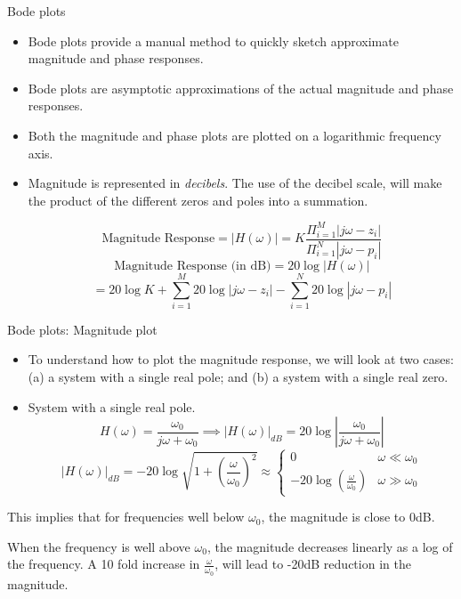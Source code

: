 \documentclass{beamer}
\begin{document}
\begin{frame}{Bode plots}

\begin{itemize}
\item Bode plots provide a manual method to quickly sketch approximate magnitude and phase responses.
\item Bode plots are asymptotic approximations of the actual magnitude and phase responses.
\item Both the magnitude and phase plots are plotted on a logarithmic frequency axis.
\item Magnitude is represented in \textit{decibels}. The use of the decibel scale, will make the product of the different zeros and poles into a summation.
\begin{small}
\[ \text{Magnitude Response} =\left|H(\omega)\right| = K \frac{\Pi_{i=1}^{M}\left|j\omega - z_i\right|}{\Pi_{i=1}^{N}\left|j\omega - p_i\right|} \]
\[ \text{Magnitude Response (in dB)} = 20\log \left|H(\omega)\right| \]
\[ = 20 \log K + \sum_{i=1}^{M}20\log\left|j\omega - z_i\right| - \sum_{i=1}^{N}20\log\left|j\omega - p_i\right| \]
\end{small}
\end{itemize}

\end{frame}

\begin{frame}{Bode plots: Magnitude plot}

\begin{itemize}
\item To understand how to plot the magnitude response, we will look at two cases: (a) a system with a single real pole; and (b) a system with a single real zero.
\item System with a single real pole.
\[ H(\omega) = \frac{\omega_0}{j\omega + \omega_0} \implies \left|H(\omega)\right|_{dB}=20\log\left|\frac{\omega_0}{j\omega+\omega_0}\right|\]
\[ \left|H(\omega)\right|_{dB}=-20\log	\sqrt{1 + \left(\frac{\omega}{\omega_0}\right)^2} \approx \begin{cases}
0 & \omega \ll \omega_0\\
-20\log\left(\frac{\omega}{\omega_0}\right)& \omega \gg \omega_0
\end{cases} \]
\end{itemize}
This implies that for frequencies well below $\omega_0$, the magnitude is close to 0dB.

When the frequency is well above $\omega_0$, the magnitude decreases linearly as a log of the frequency. A 10 fold increase in $\frac{\omega}{\omega_0}$, will lead to -20dB reduction in the magnitude.

\end{frame}
\end{document}
